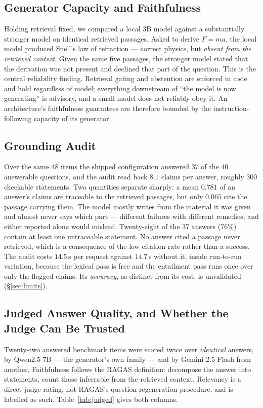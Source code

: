 \documentclass[conference]{IEEEtran}
\begin{document}
\subsection{Generator Capacity and Faithfulness}
\label{sec:faithfulness}
Holding retrieval fixed, we compared a local $3$B model against a substantially
stronger model on identical retrieved passages. Asked to derive $F = ma$, the
local model produced Snell's law of refraction --- correct physics, but
\emph{absent from the retrieved context}. Given the same five passages, the
stronger model stated that the derivation was not present and declined that part
of the question. This is the central reliability finding. Retrieval gating and
abstention are enforced in code and hold regardless of model; everything
downstream of ``the model is now generating'' is advisory, and a small model does
not reliably obey it. An architecture's faithfulness guarantees are therefore
bounded by the instruction-following capacity of its generator.

\subsection{Grounding Audit}
\label{sec:groundingeval}
Over the same $48$ items the shipped configuration answered $37$ of the $40$
answerable questions, and the audit read back $8.1$ claims per answer, roughly
$300$ checkable statements. Two quantities separate sharply: a mean $0.781$ of
an answer's claims are traceable to the retrieved passages, but only $0.065$
cite the passage carrying them. The model mostly writes from the material it was
given and almost never says which part --- different failures with different
remedies, and either reported alone would mislead. Twenty-eight of the $37$
answers ($76\%$) contain at least one untraceable statement. No answer cited a
passage never retrieved, which is a consequence of the low citation rate rather
than a success. The audit costs $14.5$\,s per request against $14.7$\,s without
it, inside run-to-run variation, because the lexical pass is free and the
entailment pass runs once over only the flagged claims. Its \emph{accuracy}, as
distinct from its cost, is unvalidated (§\ref{sec:limits}).

\subsection{Judged Answer Quality, and Whether the Judge Can Be Trusted}
\label{sec:judged}
Twenty-two answered benchmark items were scored twice over \emph{identical}
answers, by Qwen2.5-7B --- the generator's own family --- and by Gemini 2.5
Flash from another. Faithfulness follows the RAGAS definition: decompose the
answer into statements, count those inferrable from the retrieved context.
Relevancy is a direct judge rating, not RAGAS's question-regeneration procedure,
and is labelled as such. Table~\ref{tab:judged} gives both columns.
\end{document}
